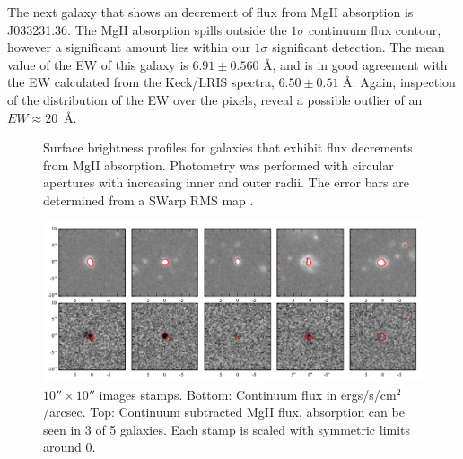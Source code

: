 \documentclass[twocolumn]{aastex6}
\begin{document}
The next galaxy that shows an decrement of flux from MgII absorption is J033231.36. The MgII absorption spills outside the $1\sigma$ continuum flux contour, however a significant amount lies within our $1\sigma$ significant detection. The mean value of the EW of this galaxy is $6.91 \pm 0.560$ \AA, and is in good agreement with the EW calculated from the Keck/LRIS spectra, $6.50 \pm 0.51$ \AA. Again, inspection of the distribution of the EW over the pixels, reveal a possible outlier of an $EW\approx 20$\ \AA.


\begin{figure}
\centering
{}
\caption{Surface brightness profiles for galaxies that exhibit flux decrements from MgII absorption. Photometry was performed with circular apertures with increasing inner and outer radii. The error bars are determined from a SWarp RMS map .}
\label{fig:sb_profiles}
\end{figure}

\begin{figure}[!htb]
\centering
\includegraphics[scale=0.7]{stamps.pdf}
\caption{ $10'' \times 10''$ images stamps. Bottom: Continuum flux in ergs/s/cm$^2$/arcsec. Top: Continuum subtracted MgII flux, absorption can be seen in 3 of 5 galaxies. Each stamp is scaled with symmetric limits around 0.}
\label{fig:stamp_images}
\end{figure}
\end{document}

